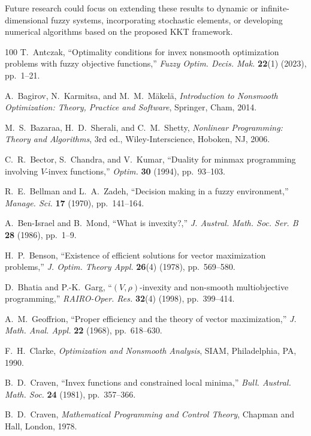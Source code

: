 \documentclass{article}
\theoremstyle{definition}
\begin{document}
Future research could focus on extending these results to dynamic or infinite-dimensional fuzzy systems, incorporating stochastic elements, or developing numerical algorithms based on the proposed KKT framework.

\begin{thebibliography}{100}
T.~Antczak,
``Optimality conditions for invex nonsmooth optimization problems with fuzzy objective functions,''
\emph{Fuzzy Optim. Decis. Mak.} \textbf{22}(1) (2023), pp.~1--21.  %

A.~Bagirov, N.~Karmitsa, and M.~M.~M\"akel\"a,
\emph{Introduction to Nonsmooth Optimization: Theory, Practice and Software},
Springer, Cham, 2014.

M.~S.~Bazaraa, H.~D.~Sherali, and C.~M.~Shetty,
\emph{Nonlinear Programming: Theory and Algorithms},
3rd ed., Wiley-Interscience, Hoboken, NJ, 2006.

C.~R.~Bector, S.~Chandra, and V.~Kumar,
``Duality for minmax programming involving $V$-invex functions,''
\emph{Optim.} \textbf{30} (1994), pp.~93--103.

R.~E.~Bellman and L.~A.~Zadeh,
``Decision making in a fuzzy environment,''
\emph{Manage. Sci.} \textbf{17} (1970), pp.~141--164.

A.~Ben-Israel and B.~Mond,
``What is invexity?,''
\emph{J. Austral. Math. Soc. Ser. B} \textbf{28} (1986), pp.~1--9.

H.~P.~Benson,
``Existence of efficient solutions for vector maximization problems,''
\emph{J. Optim. Theory Appl.} \textbf{26}(4) (1978), pp.~569--580.

D.~Bhatia and P.-K.~Garg,
``$(V,\rho)$-invexity and non-smooth multiobjective programming,''
\emph{RAIRO-Oper. Res.} \textbf{32}(4) (1998), pp.~399--414.

A.~M.~Geoffrion,
``Proper efficiency and the theory of vector maximization,''
\emph{J. Math. Anal. Appl.} \textbf{22} (1968), pp.~618--630.

F.~H.~Clarke,
\emph{Optimization and Nonsmooth Analysis},
SIAM, Philadelphia, PA, 1990.

B.~D.~Craven,
``Invex functions and constrained local minima,''
\emph{Bull. Austral. Math. Soc.} \textbf{24} (1981), pp.~357--366.

B.~D.~Craven,
\emph{Mathematical Programming and Control Theory},
Chapman and Hall, London, 1978.


\end{thebibliography}
\end{document}
